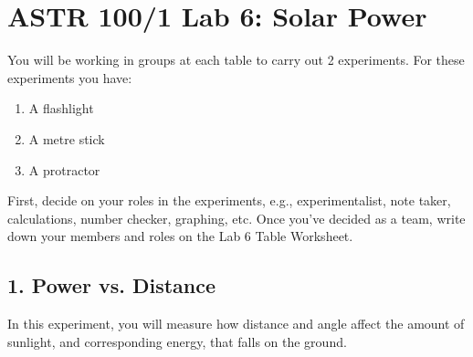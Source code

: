 \documentclass[main.tex]{subfiles}
\begin{document}
\section*{ASTR 100/1 Lab 6: Solar Power}

You will be working in groups at each table to carry out 2 experiments. For these experiments you have:
\begin{enumerate}
\item A flashlight
\item A metre stick
\item A protractor
\end{enumerate}

First, decide on your roles in the experiments, e.g., experimentalist, note taker, calculations, number checker, graphing, etc. Once you've decided as a team, write down your members and roles on the Lab 6 Table Worksheet.

\subsection*{1. Power vs. Distance}
In this experiment, you will measure how distance and angle affect the amount of sunlight, and corresponding energy, that falls on the ground.
\end{document}
